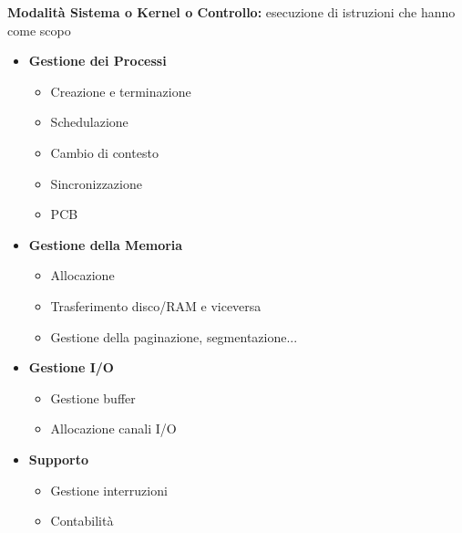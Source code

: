 \documentclass[12pt, letterpaper]{report}
\begin{document}
	\noindent
	\textbf{Modalità Sistema o Kernel o Controllo:} esecuzione di istruzioni che hanno come scopo

	\begin{itemize}[leftmargin=*, itemsep=0.2em]
		\item \textbf{Gestione dei Processi}
		\begin{itemize}[leftmargin=2em, itemsep=0.1em]
			\item Creazione e terminazione
			\item Schedulazione
			\item Cambio di contesto
			\item Sincronizzazione
			\item PCB
		\end{itemize}

		\item \textbf{Gestione della Memoria}
		\begin{itemize}[leftmargin=2em, itemsep=0.1em]
			\item Allocazione
			\item Trasferimento disco/RAM e viceversa
			\item Gestione della paginazione, segmentazione...
		\end{itemize}

		\item \textbf{Gestione I/O}
		\begin{itemize}[leftmargin=2em, itemsep=0.1em]
			\item Gestione buffer
			\item Allocazione canali I/O
		\end{itemize}

		\item \textbf{Supporto}
		\begin{itemize}[leftmargin=2em, itemsep=0.1em]
			\item Gestione interruzioni
			\item Contabilità
		\end{itemize}
	\end{itemize}
\end{document}
